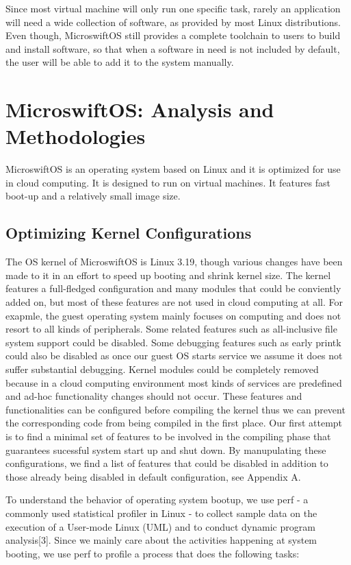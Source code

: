 Since most virtual machine will only run one specific task, rarely an application will need a wide collection of software, as provided by most Linux distributions. Even though, MicroswiftOS still provides a complete toolchain to users to build and install software, so that when a software in need is not included by default, the user will be able to add it to the system manually.

\section{MicroswiftOS: Analysis and Methodologies}
\label{sec:micro}

MicroswiftOS is an operating system based on Linux and it is optimized for use in cloud computing. It is designed to run on virtual machines. It features fast boot-up and a relatively small image size.

\subsection{Optimizing Kernel Configurations}

The OS kernel of MicroswiftOS is Linux 3.19, though various changes have been made to it in an effort to speed up booting and shrink kernel size. The kernel features a full-fledged configuration and many modules that could be conviently added on, but most of these features are not used in cloud computing at all. For exapmle, the guest operating system mainly focuses on computing and does not resort to all kinds of peripherals. Some related features such as all-inclusive file system support could be disabled. Some debugging features such as early printk could also be disabled as once our guest OS starts service we assume it does not suffer substantial debugging. Kernel modules could be completely removed because in a cloud computing environment most kinds of services are predefined and ad-hoc functionality changes should not occur. These features and functionalities can be configured before compiling the kernel thus we can prevent the corresponding code from being compiled in the first place.
Our first attempt is to find a minimal set of features to be involved in the compiling phase that guarantees sucessful system start up and shut down. By manupulating these configurations, we find a list of features that could be disabled in addition to those already being disabled in default configuration, see Appendix A.

To understand the behavior of operating system bootup, we use perf - a commonly used statistical profiler in Linux - to collect sample data on the execution of a User-mode Linux (UML) and to conduct dynamic program analysis[3]. Since we mainly care about the activities happening at system booting, we use perf to profile a process that does the following tasks:

